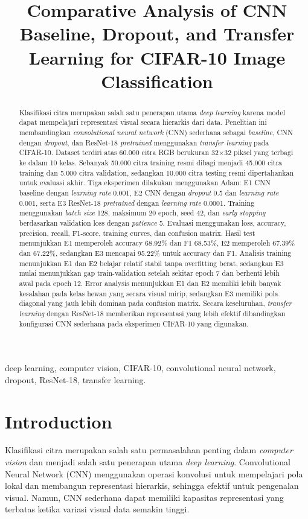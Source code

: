 \documentclass[conference,a4paper]{IEEEtran}
\title{Comparative Analysis of CNN Baseline, Dropout, and Transfer Learning for CIFAR-10 Image Classification}
\author{\IEEEauthorblockN{Ahmad Furqon Ramadhani}
\IEEEauthorblockA{Program Studi Teknik Informatika\\
Universitas Darussalam Gontor\\
NIM: 452024611066\\
Email: afurqonramadhani24@student.cs.unida.gontor.ac.id}}
\begin{document}
\pagestyle{empty}
\maketitle

\begin{abstract}
Klasifikasi citra merupakan salah satu penerapan utama \textit{deep learning} karena model dapat mempelajari representasi visual secara hierarkis dari data. Penelitian ini membandingkan \textit{convolutional neural network} (CNN) sederhana sebagai \textit{baseline}, CNN dengan \textit{dropout}, dan ResNet-18 \textit{pretrained} menggunakan \textit{transfer learning} pada CIFAR-10. Dataset terdiri atas 60.000 citra RGB berukuran 32$\times$32 piksel yang terbagi ke dalam 10 kelas. Sebanyak 50.000 citra training resmi dibagi menjadi 45.000 citra training dan 5.000 citra validation, sedangkan 10.000 citra testing resmi dipertahankan untuk evaluasi akhir. Tiga eksperimen dilakukan menggunakan Adam: E1 CNN baseline dengan \textit{learning rate} 0.001, E2 CNN dengan \textit{dropout} 0.5 dan \textit{learning rate} 0.001, serta E3 ResNet-18 \textit{pretrained} dengan \textit{learning rate} 0.0001. Training menggunakan \textit{batch size} 128, maksimum 20 epoch, seed 42, dan \textit{early stopping} berdasarkan validation loss dengan \textit{patience} 5. Evaluasi menggunakan loss, accuracy, precision, recall, F1-score, training curves, dan confusion matrix. Hasil test menunjukkan E1 memperoleh accuracy 68.92\% dan F1 68.53\%, E2 memperoleh 67.39\% dan 67.22\%, sedangkan E3 mencapai 95.22\% untuk accuracy dan F1. Analisis training menunjukkan E1 dan E2 belajar relatif stabil tanpa overfitting berat, sedangkan E3 mulai menunjukkan gap train-validation setelah sekitar epoch 7 dan berhenti lebih awal pada epoch 12. Error analysis menunjukkan E1 dan E2 memiliki lebih banyak kesalahan pada kelas hewan yang secara visual mirip, sedangkan E3 memiliki pola diagonal yang jauh lebih dominan pada confusion matrix. Secara keseluruhan, \textit{transfer learning} dengan ResNet-18 memberikan representasi yang lebih efektif dibandingkan konfigurasi CNN sederhana pada eksperimen CIFAR-10 yang digunakan.
\end{abstract}

\begin{IEEEkeywords}
deep learning, computer vision, CIFAR-10, convolutional neural network, dropout, ResNet-18, transfer learning.
\end{IEEEkeywords}

\section{Introduction}
Klasifikasi citra merupakan salah satu permasalahan penting dalam \textit{computer vision} dan menjadi salah satu penerapan utama \textit{deep learning}. Convolutional Neural Network (CNN) menggunakan operasi konvolusi untuk mempelajari pola lokal dan membangun representasi hierarkis, sehingga efektif untuk pengenalan visual. Namun, CNN sederhana dapat memiliki kapasitas representasi yang terbatas ketika variasi visual data semakin tinggi.
\end{document}
